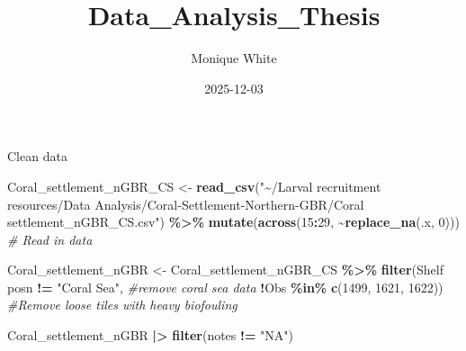 \documentclass[
]{article}
\title{Data\_Analysis\_Thesis}
\author{Monique White}
\date{2025-12-03}
\newenvironment{Shaded}{\begin{snugshade}}{\end{snugshade}}
\newcommand{\AttributeTok}[1]{\textcolor[rgb]{0.13,0.29,0.53}{#1}}
\newcommand{\CommentTok}[1]{\textcolor[rgb]{0.56,0.35,0.01}{\textit{#1}}}
\newcommand{\DecValTok}[1]{\textcolor[rgb]{0.00,0.00,0.81}{#1}}
\newcommand{\FunctionTok}[1]{\textcolor[rgb]{0.13,0.29,0.53}{\textbf{#1}}}
\newcommand{\NormalTok}[1]{#1}
\newcommand{\OtherTok}[1]{\textcolor[rgb]{0.56,0.35,0.01}{#1}}
\newcommand{\SpecialCharTok}[1]{\textcolor[rgb]{0.81,0.36,0.00}{\textbf{#1}}}
\newcommand{\StringTok}[1]{\textcolor[rgb]{0.31,0.60,0.02}{#1}}
\begin{document}
\maketitle

Clean data

\begin{Shaded}
\begin{Highlighting}[]
\NormalTok{Coral\_settlement\_nGBR\_CS }\OtherTok{\textless{}{-}} \FunctionTok{read\_csv}\NormalTok{(}\StringTok{"\textasciitilde{}/Larval recruitment resources/Data Analysis/Coral{-}Settlement{-}Northern{-}GBR/Coral settlement\_nGBR\_CS.csv"}\NormalTok{) }\SpecialCharTok{\%\textgreater{}\%}
  \FunctionTok{mutate}\NormalTok{(}\FunctionTok{across}\NormalTok{(}\DecValTok{15}\SpecialCharTok{:}\DecValTok{29}\NormalTok{, }\SpecialCharTok{\textasciitilde{}}\FunctionTok{replace\_na}\NormalTok{(.x, }\DecValTok{0}\NormalTok{))) }\CommentTok{\# Read in data}

\NormalTok{Coral\_settlement\_nGBR }\OtherTok{\textless{}{-}}\NormalTok{ Coral\_settlement\_nGBR\_CS }\SpecialCharTok{\%\textgreater{}\%} 
  \FunctionTok{filter}\NormalTok{(}\StringTok{\textasciigrave{}}\AttributeTok{Shelf posn}\StringTok{\textasciigrave{}} \SpecialCharTok{!=} \StringTok{"Coral Sea"}\NormalTok{, }\CommentTok{\#remove coral sea data}
        \SpecialCharTok{!}\NormalTok{Obs }\SpecialCharTok{\%in\%} \FunctionTok{c}\NormalTok{(}\DecValTok{1499}\NormalTok{, }\DecValTok{1621}\NormalTok{, }\DecValTok{1622}\NormalTok{)) }\CommentTok{\#Remove loose tiles with heavy biofouling}

\NormalTok{Coral\_settlement\_nGBR }\SpecialCharTok{|\textgreater{}} 
  \FunctionTok{filter}\NormalTok{(notes }\SpecialCharTok{!=} \StringTok{"NA"}\NormalTok{)}
\end{Highlighting}
\end{Shaded}
\end{document}
